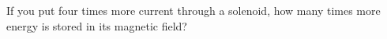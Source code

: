 If you put four times more current through a solenoid, how
        many times more energy is stored in its magnetic field?\answercheck
